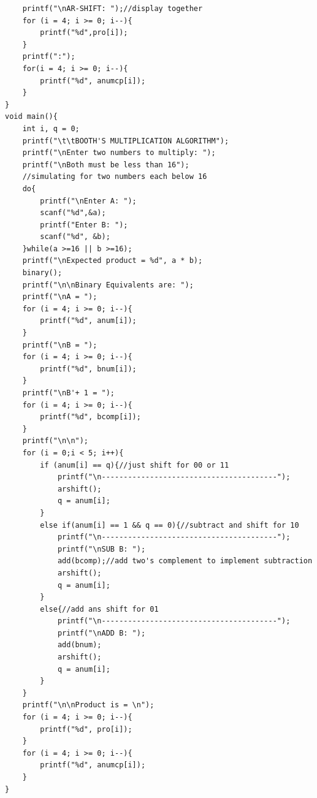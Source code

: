 \documentclass[10pt,a4paper]{article}
\begin{document}
\begin{lstlisting}
    printf("\nAR-SHIFT: ");//display together
    for (i = 4; i >= 0; i--){
        printf("%d",pro[i]);
    }
    printf(":");
    for(i = 4; i >= 0; i--){
        printf("%d", anumcp[i]);
    }
}
void main(){
    int i, q = 0;
    printf("\t\tBOOTH'S MULTIPLICATION ALGORITHM");
    printf("\nEnter two numbers to multiply: ");
    printf("\nBoth must be less than 16");
    //simulating for two numbers each below 16
    do{
        printf("\nEnter A: ");
        scanf("%d",&a);
        printf("Enter B: ");
        scanf("%d", &b);
    }while(a >=16 || b >=16);
    printf("\nExpected product = %d", a * b);
    binary();
    printf("\n\nBinary Equivalents are: ");
    printf("\nA = ");
    for (i = 4; i >= 0; i--){
        printf("%d", anum[i]);
    }
    printf("\nB = ");
    for (i = 4; i >= 0; i--){
        printf("%d", bnum[i]);
    }
    printf("\nB'+ 1 = ");
    for (i = 4; i >= 0; i--){
        printf("%d", bcomp[i]);
    }
    printf("\n\n");
    for (i = 0;i < 5; i++){
        if (anum[i] == q){//just shift for 00 or 11
            printf("\n----------------------------------------");
            arshift();
            q = anum[i];
        }
        else if(anum[i] == 1 && q == 0){//subtract and shift for 10
            printf("\n----------------------------------------");
            printf("\nSUB B: ");
            add(bcomp);//add two's complement to implement subtraction
            arshift();
            q = anum[i];
        }
        else{//add ans shift for 01
            printf("\n----------------------------------------");
            printf("\nADD B: ");
            add(bnum);
            arshift();
            q = anum[i];
        }
    }
    printf("\n\nProduct is = \n");
    for (i = 4; i >= 0; i--){
        printf("%d", pro[i]);
    }
    for (i = 4; i >= 0; i--){
        printf("%d", anumcp[i]);
    }
}

\end{lstlisting}
\end{document}
